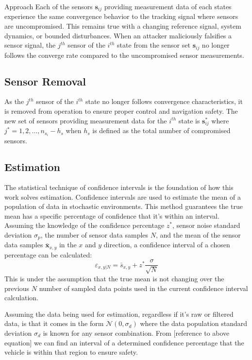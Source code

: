 \begin{section}{Approach}
Each of the sensors $\bm{s}_{ij}$ providing measurement data of each states experience the same convergence behavior to the tracking signal where sensors are uncompromised. This remains true with a changing reference signal, system dynamics, or bounded disturbances. When an attacker maliciously falsifies a sensor signal, the $j^{th}$ sensor of the $i^{th}$ state from the sensor set $\bm{s}_{ij}$ no longer follows the converge rate compared to the uncompromised sensor measurements. 

\subsection{Sensor Removal}

As the $j^{th}$ sensor of the $i^{th}$ state no longer follows convergence characteristics, it is removed from operation to ensure proper control and navigation safety. The new set of sensors providing measurement data for the $i^{th}$ state is $\bm{s}_{ij}^*$ where $j^*=1,2,\dots,n_{s_i}-h_s$ when $h_s$ is defined as the total number of compromised sensors.

\subsection{Estimation}

The statistical technique of confidence intervals is the foundation of how this work solves estimation. Confidence intervals are used to estimate the mean of a population of data in stochastic environments. This method guarantees the true mean has a specific percentage of confidence that it's within an interval. Assuming the knowledge of the confidence percentage $z^{*}$, sensor noise standard deviation $ \sigma_p $, the number of sensor data samples $N$, and the mean of the sensor data samples $ \bm{\bar{x}}_{x,y} $ in the $x$ and $y$ direction, a confidence interval of a chosen percentage can be calculated: 
 	\begin{equation}
		\varepsilon_{x,y|N} = \bar{s}_{x,y} + z^{*}\frac{\sigma}{\sqrt{N}}
	\end{equation}
This is under the assumption that the true mean is not changing over the previous $N$ number of sampled data points used in the current confidence interval calculation.

Assuming the data being used for estimation, regardless if it's raw or filtered data, is that it comes in the form $\mathcal{N}(0,\sigma_d)$ where the data population standard deviation $\sigma_d$ is known for any sensor combination. From [reference to above equation] we can find an interval of a determined confidence percentage that the vehicle is within that region to ensure safety. 


\end{section}

